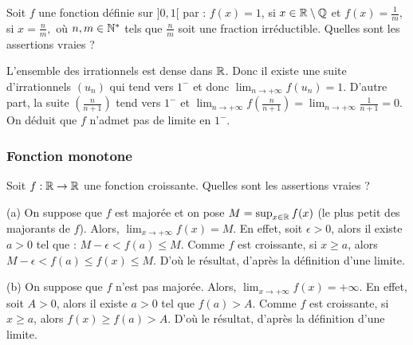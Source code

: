 \begin{question} 
Soit  $f$ une fonction définie sur $]0,1[$ par :  
$f(x)=1$, si $x \in \mathbb{R} \setminus \mathbb{Q}$ et $f(x)=\frac{1}{m},$ si $x= \frac{n}{m},$ où  $n, m \in \mathbb{N}^*$ tels que $ \frac{n}{m}$ soit une fraction irréductible. Quelles sont les assertions vraies ?
\begin{answers}

    
    
    
    

\end{answers}
\begin{explanations}
L'ensemble des irrationnels est dense dans $\mathbb{R}$. Donc il existe une suite d'irrationnels $(u_n)$ qui tend vers $1^-$ et donc  $\lim_{n\to +\infty} f(u_n)=1$.  D'autre part, la suite $(\frac{n}{n+1})$  tend vers $1^-$ et $\lim_{n\to +\infty} f(\frac{n}{n+1})=\lim_{n\to +\infty} \frac{1}{n+1} = 0 $. On déduit que  $f$ n'admet pas de limite en $1^-$.
\end{explanations}

\end{question}



\subsubsection{Fonction monotone}

\begin{question} 
Soit  $f:\mathbb{R} \to \mathbb{R}$ une fonction croissante. Quelles sont les assertions vraies ?
\begin{answers}
      
      
      
    
   
\end{answers}
\begin{explanations}
(a)  On suppose que $f$ est majorée et on pose $M=\sup_{x\in \mathbb{R}} f(x)$ (le plus petit des majorants de $f$). Alors, $ \lim_{x\to +\infty } f(x)=M$. En effet,
soit $\epsilon >0$, alors il existe $a>0$ tel que : $M-\epsilon < f(a)\le M $. Comme $f$ est croissante, si $x\ge a$, alors $M-\epsilon < f(a)\le f(x)\le M $. D'où le résultat, d'après la définition d'une limite.

(b)  On suppose que $f$ n'est pas majorée. Alors, $ \lim_{x\to +\infty } f(x)=+\infty$. En effet, soit $A>0$, alors il existe $a>0$ tel que $f(a)>A$. Comme $f$ est croissante, si $x\ge a$, alors $f(x)\ge f(a)>A$. D'où le résultat, d'après la définition d'une limite.
\end{explanations}

\end{question}


